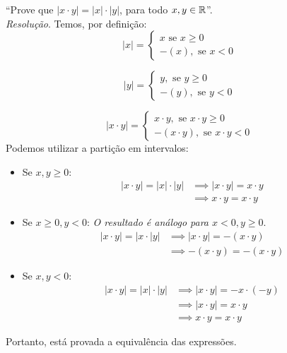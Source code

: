 \enquote{Prove que $|x \cdot y| = |x| \cdot |y|$, para todo $x, y \in \mathbb R$}.
\\ \emph{Resolução}. Temos, por definição:
\begin{displaymath}
    |x| = \left\{\begin{array}{cc}
         x \text{ se } x \ge 0 &  \\
         -(x), \text{ se } x < 0 & 
    \end{array}\right.
\end{displaymath}

\begin{displaymath}
    |y| = \left\{\begin{array}{cc}
            y, \text{ se } y \ge 0 &  \\
         -(y), \text{ se } y < 0 & 
    \end{array}\right.
\end{displaymath}

\begin{displaymath}
    |x \cdot y| = \left\{\begin{array}{cc}
         x\cdot y, \text{ se } x \cdot y \ge 0 &  \\
         -(x\cdot y), \text{ se } x \cdot y < 0 & 
    \end{array}\right.
\end{displaymath}
Podemos utilizar a partição em intervalos:
\begin{itemize}
    \item Se $x, y \ge 0$:
    \begin{align*}
        |x \cdot y| = |x| \cdot |y| & \implies |x \cdot y| = x \cdot y \\ & \implies
        x \cdot y = x \cdot y
    \end{align*}
    
    \item Se $x \ge 0, y < 0$: \emph{O resultado é análogo para $x < 0, y \ge 0$}.
    \begin{align*}
    |x \cdot y| = |x \cdot |y| & \implies |x \cdot y| = -(x \cdot y) \\ & \implies -(x\cdot y) = -(x \cdot y)
    \end{align*}
    
    \item Se $x, y < 0$:
    \begin{align*}
    |x \cdot y| = |x| \cdot |y| & \implies |x \cdot y| = -x \cdot (-y) \\ & \implies |x \cdot y| = x \cdot y \\ & \implies
        x \cdot y = x \cdot y
    \end{align*}
\end{itemize}
Portanto, está provada a equivalência das expressões.